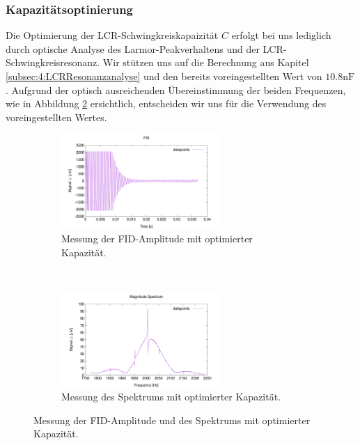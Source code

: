 \documentclass[../../main.tex]{subfiles}
\begin{document}
        \subsubsection*{Kapazitätsoptinierung}\label{subsubsec:5:Kapazitaetsoptimierung}
            Die Optimierung der LCR-Schwingkreiskapaizität $C$ erfolgt bei uns lediglich durch optische Analyse des Larmor-Peakverhaltens und der LCR-Schwingkreisresonanz. Wir stützen uns auf die Berechnung aus Kapitel \ref{subsec:4:LCRResonanzanalyse} und den bereits voreingestellten Wert von $10.8\si{\nano\farad}$. Aufgrund der optisch ausreichenden Übereinstimmung der beiden Frequenzen, wie in Abbildung \ref{fig:5:OptiCSpectrum} ersichtlich, entscheiden wir uns für die Verwendung des voreingestellten Wertes.
            \begin{figure}[H]
                \centering
                \begin{subfigure}[t]{0.45\textwidth}
                    \centering
                    \includegraphics[width=6cm]{Bilddateien/5/C_Opti_FID.png}
                    \caption{Messung der FID-Amplitude mit optimierter Kapazität.}
                \end{subfigure}
                \
                \begin{subfigure}[t]{0.45\textwidth}
                    \centering
                    \includegraphics[width=6cm]{Bilddateien/5/C_Opti_Spectrum.png}
                    \caption{Messung des Spektrums mit optimierter Kapazität.}
                    \label{subfig:5:OptiCSpectrum}
                \end{subfigure}
                \caption{Messung der FID-Amplitude und des Spektrums mit optimierter Kapazität.}
                \label{fig:5:OptiCSpectrum}
            \end{figure}
\end{document}
